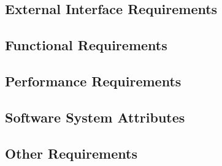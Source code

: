 \documentclass[10pt,a4paper]{article}
\begin{document}
		\subsection{External Interface Requirements}
		
		\subsection{Functional Requirements}
		
		\subsection{Performance Requirements}
		
		\subsection{Software System Attributes}
		
		\subsection{Other Requirements}
\end{document}
